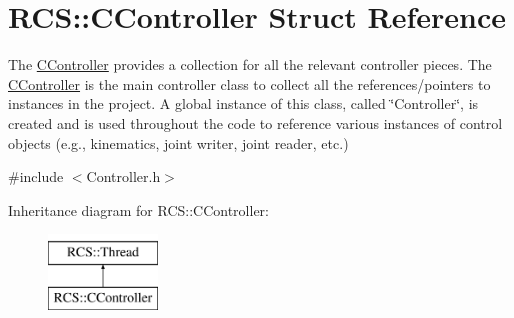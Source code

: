 \hypertarget{structRCS_1_1CController}{\section{R\-C\-S\-:\-:C\-Controller Struct Reference}
\label{structRCS_1_1CController}
}


The \hyperlink{structRCS_1_1CController}{C\-Controller} provides a collection for all the relevant controller pieces. The \hyperlink{structRCS_1_1CController}{C\-Controller} is the main controller class to collect all the references/pointers to instances in the project. A global instance of this class, called \char`\"{}\-Controller\char`\"{}, is created and is used throughout the code to reference various instances of control objects (e.\-g., kinematics, joint writer, joint reader, etc.)  




{\ttfamily \#include $<$Controller.\-h$>$}

Inheritance diagram for R\-C\-S\-:\-:C\-Controller\-:\begin{figure}[H]
\begin{center}
\leavevmode
\includegraphics[height=2.000000cm]{structRCS_1_1CController}
\end{center}
\end{figure}
